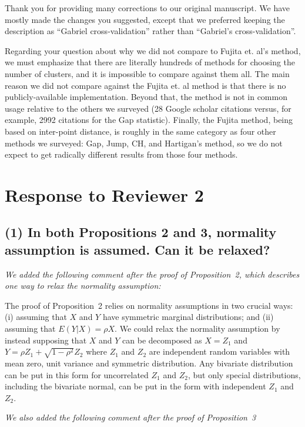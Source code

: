 \documentclass[11pt]{article}
\begin{document}
Thank you for providing many corrections to our original manuscript. We have
mostly made the changes you suggested, except that we preferred keeping the
description as ``Gabriel cross-validation'' rather than ``Gabriel's
cross-validation''.

Regarding your question about why we did not compare to Fujita et. al's
method, we must emphasize that there are literally hundreds of methods for
choosing the number of clusters, and it is impossible to compare against them
all. The main reason we did not compare against the Fujita et. al method is
that there is no publicly-available implementation. Beyond that, the method is
not in common usage relative to the others we surveyed (28 Google scholar
citations versus, for example, 2992 citations for the Gap statistic). Finally,
the Fujita method, being based on inter-point distance, is roughly in the same
category as four other methods we surveyed: Gap, Jump, CH, and Hartigan's
method, so we do not expect to get radically different results from those four
methods.



\section{Response to Reviewer 2}

\subsection{(1) In both Propositions 2 and 3, normality assumption is assumed.
Can it be relaxed?}

\emph{We added the following comment after the proof of Proposition~2, which
describes one way to relax the normality assumption:}

The proof of Proposition~2 relies on normality assumptions
in two crucial ways: (i) assuming that $X$ and $Y$ have symmetric marginal
distributions; and (ii) assuming that $E(Y|X) = \rho X$. We could relax the
normality assumption by instead supposing that $X$ and $Y$ can be decomposed
as $X = Z_1$ and $Y = \rho Z_1 + \sqrt{1-\rho^2}Z_2$ where $Z_1$ and $Z_2$ are
independent random variables with mean zero, unit variance and symmetric
distribution. Any bivariate distribution can be put in this form for
uncorrelated $Z_1$ and $Z_2$, but only special distributions, including the
bivariate normal, can be put in the form with independent $Z_1$ and $Z_2$.

\emph{We also added the following comment after the proof of Proposition~3}
\end{document}
